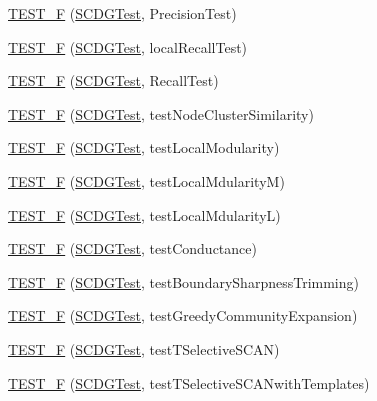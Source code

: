 \begin{DoxyCompactItemize}
\hyperlink{namespace_networ_kit_a5ffd320488d36dd88bd7a7454831172e}{T\-E\-S\-T\-\_\-\-F} (\hyperlink{class_networ_kit_1_1_s_c_d_g_test}{S\-C\-D\-G\-Test}, Precision\-Test)
\item 
\hyperlink{namespace_networ_kit_a2034f98fa77ed6d6dcd7714331fea99f}{T\-E\-S\-T\-\_\-\-F} (\hyperlink{class_networ_kit_1_1_s_c_d_g_test}{S\-C\-D\-G\-Test}, local\-Recall\-Test)
\item 
\hyperlink{namespace_networ_kit_a0619d12cf9753dde8652bde4c7600f2b}{T\-E\-S\-T\-\_\-\-F} (\hyperlink{class_networ_kit_1_1_s_c_d_g_test}{S\-C\-D\-G\-Test}, Recall\-Test)
\item 
\hyperlink{namespace_networ_kit_ac2d7837fe8a48d8d68b52f2c2fba0397}{T\-E\-S\-T\-\_\-\-F} (\hyperlink{class_networ_kit_1_1_s_c_d_g_test}{S\-C\-D\-G\-Test}, test\-Node\-Cluster\-Similarity)
\item 
\hyperlink{namespace_networ_kit_aa02a218039a8c1dea9bba2877ad4175e}{T\-E\-S\-T\-\_\-\-F} (\hyperlink{class_networ_kit_1_1_s_c_d_g_test}{S\-C\-D\-G\-Test}, test\-Local\-Modularity)
\item 
\hyperlink{namespace_networ_kit_ace12ab587c0166e0cd17353802497c1f}{T\-E\-S\-T\-\_\-\-F} (\hyperlink{class_networ_kit_1_1_s_c_d_g_test}{S\-C\-D\-G\-Test}, test\-Local\-Mdularity\-M)
\item 
\hyperlink{namespace_networ_kit_a50df8650f72a97df69b6aea2ce7e09da}{T\-E\-S\-T\-\_\-\-F} (\hyperlink{class_networ_kit_1_1_s_c_d_g_test}{S\-C\-D\-G\-Test}, test\-Local\-Mdularity\-L)
\item 
\hyperlink{namespace_networ_kit_a0ab923176084e8c1fd91aa93d2270f51}{T\-E\-S\-T\-\_\-\-F} (\hyperlink{class_networ_kit_1_1_s_c_d_g_test}{S\-C\-D\-G\-Test}, test\-Conductance)
\item 
\hyperlink{namespace_networ_kit_aa3f3adfd3569db4e63d2abc1acbccc93}{T\-E\-S\-T\-\_\-\-F} (\hyperlink{class_networ_kit_1_1_s_c_d_g_test}{S\-C\-D\-G\-Test}, test\-Boundary\-Sharpness\-Trimming)
\item 
\hyperlink{namespace_networ_kit_ab0ddf74e23e1883181e6ca363fcb3cb3}{T\-E\-S\-T\-\_\-\-F} (\hyperlink{class_networ_kit_1_1_s_c_d_g_test}{S\-C\-D\-G\-Test}, test\-Greedy\-Community\-Expansion)
\item 
\hyperlink{namespace_networ_kit_a968525a2e0a93c2d3bb52a2ea07d937c}{T\-E\-S\-T\-\_\-\-F} (\hyperlink{class_networ_kit_1_1_s_c_d_g_test}{S\-C\-D\-G\-Test}, test\-T\-Selective\-S\-C\-A\-N)
\item 
\hyperlink{namespace_networ_kit_ac8234100d2c03407b7e05e2d7e09b8ad}{T\-E\-S\-T\-\_\-\-F} (\hyperlink{class_networ_kit_1_1_s_c_d_g_test}{S\-C\-D\-G\-Test}, test\-T\-Selective\-S\-C\-A\-Nwith\-Templates)

\end{DoxyCompactItemize}
